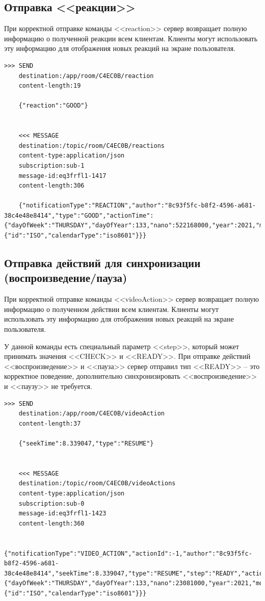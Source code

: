\documentclass{../../includes/TechDoc}
\begin{document}
    \subsection{Отправка <<реакции>>}

    При корректной отправке команды <<reaction>> сервер возвращает полную информацию о полученной реакции всем клиентам.
    Клиенты могут использовать эту информацию для отображения новых реакций на экране пользователя.

    \begin{lstlisting}[language=text,caption={Запрос и ответ при отправке <<реакции>>}]
    >>> SEND
    destination:/app/room/C4EC0B/reaction
    content-length:19

    {"reaction":"GOOD"}


    <<< MESSAGE
    destination:/topic/room/C4EC0B/reactions
    content-type:application/json
    subscription:sub-1
    message-id:eq3frfl1-1417
    content-length:306

    {"notificationType":"REACTION","author":"8c93f5fc-b8f2-4596-a681-38c4e48e8414","type":"GOOD","actionTime":{"dayOfWeek":"THURSDAY","dayOfYear":133,"nano":522168000,"year":2021,"monthValue":5,"dayOfMonth":13,"hour":23,"minute":31,"second":50,"month":"MAY","chronology":{"id":"ISO","calendarType":"iso8601"}}}
    \end{lstlisting}

    \subsection{Отправка действий для синхронизации (воспроизведение/пауза)}

    При корректной отправке команды <<videoAction>> сервер возвращает полную информацию о полученном действии всем клиентам.
    Клиенты могут использовать эту информацию для отображения новых реакций на экране пользователя.

    У данной команды есть специальный параметр <<step>>, который может принимать значения <<CHECK>> и <<READY>>.
    При отправке действий <<воспроизведение>> и <<пауза>> сервер отправил тип <<READY>> -- это корректное поведение, дополнительно синхронизировать <<воспроизведение>> и <<паузу>> не требуется.

    \begin{lstlisting}[language=text,caption={Запрос и ответ при отправке действия для синхронизации}]
    >>> SEND
    destination:/app/room/C4EC0B/videoAction
    content-length:37

    {"seekTime":8.339047,"type":"RESUME"}


    <<< MESSAGE
    destination:/topic/room/C4EC0B/videoActions
    content-type:application/json
    subscription:sub-0
    message-id:eq3frfl1-1423
    content-length:360

    {"notificationType":"VIDEO_ACTION","actionId":-1,"author":"8c93f5fc-b8f2-4596-a681-38c4e48e8414","seekTime":8.339047,"type":"RESUME","step":"READY","actionTime":{"dayOfWeek":"THURSDAY","dayOfYear":133,"nano":23081000,"year":2021,"monthValue":5,"dayOfMonth":13,"hour":23,"minute":37,"second":34,"month":"MAY","chronology":{"id":"ISO","calendarType":"iso8601"}}}
    \end{lstlisting}
\end{document}
